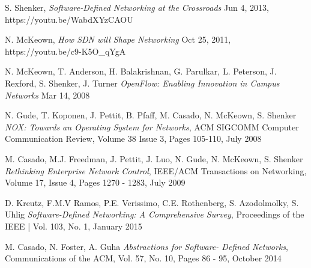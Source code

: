\documentclass[12pt,journal,compsoc]{IEEEtran}
\begin{document}
\begin{thebibliography}{1}

 S. Shenker, \emph{Software-Defined Networking at the Crossroads}
Jun 4, 2013, https://youtu.be/WabdXYzCAOU

 N. McKeown, \emph{How SDN will Shape Networking}
Oct 25, 2011, https://youtu.be/c9-K5O\_qYgA

 N. McKeown, T. Anderson, H. Balakrishnan, G. Parulkar, L. Peterson,
J. Rexford, S. Shenker, J. Turner \emph{OpenFlow: Enabling Innovation in Campus Networks}
Mar 14, 2008 

 N. Gude, T. Koponen, J. Pettit, B. Pfaff, M. Casado, N. McKeown, S. Shenker 
 \emph{NOX: Towards an Operating System for Networks}, ACM SIGCOMM Computer Communication Review,
 Volume 38 Issue 3, Pages 105-110, July 2008

 M. Casado, M.J. Freedman, J. Pettit, J. Luo, N. Gude, N. McKeown, S. Shenker 
\emph{Rethinking Enterprise Network Control}, IEEE/ACM Transactions on Networking, Volume 17,  Issue 4,
Pages 1270 - 1283, July 2009

 D. Kreutz, F.M.V Ramos, P.E. Verissimo, C.E. Rothenberg, S. Azodolmolky, S. Uhlig
\emph{Software-Defined Networking: A Comprehensive Survey}, Proceedings of the IEEE | Vol. 103, No. 1, January 2015

 M. Casado, N. Foster, A. Guha
\emph{Abstractions for Software- Defined Networks}, Communications of the ACM, Vol. 57, No. 10,
Pages 86 - 95, October 2014 





\end{thebibliography}
\end{document}
